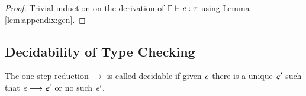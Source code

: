 \begin{proof}
    Trivial induction on the derivation of $\Gamma  \vdash  \mathit{e}  :  \tau$ using Lemma
\ref{lem:appendix:gen}.
\end{proof}

\subsection{Decidability of Type Checking}
\begin{lem}\label{lem:appendix:unired}
	The one-step reduction $ \longrightarrow $ is called decidable if 
given $\mathit{e}$ there is a unique $\mathit{e'}$ such that $\mathit{e}  \longrightarrow  \mathit{e'}$ or no such $\mathit{e'}$.
\end{lem}

